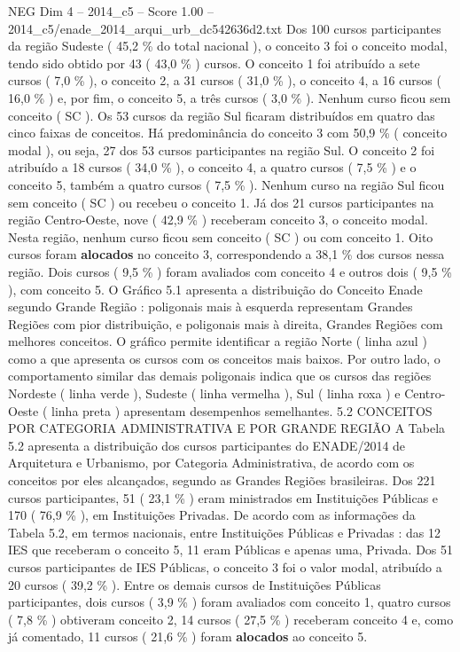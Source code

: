 \begin{textsample}{NEG Dim 4 – 2014\_c5 – Score 1.00 – 2014\_c5/enade\_2014\_arqui\_urb\_dc542636d2.txt}
Dos 100 cursos participantes da região Sudeste ( 45,2 \% do total nacional ), o conceito 3 foi o conceito modal, tendo sido obtido por 43 ( 43,0 \% ) cursos.
O conceito 1 foi atribuído a sete cursos ( 7,0 \% ), o conceito 2, a 31 cursos ( 31,0 \% ), o conceito 4, a 16 cursos ( 16,0 \% ) e, por fim, o conceito 5, a três cursos ( 3,0 \% ).
Nenhum curso ficou sem conceito ( SC ).
Os 53 cursos da região Sul ficaram distribuídos em quatro das cinco faixas de conceitos.
Há predominância do conceito 3 com 50,9 \% ( conceito modal ), ou seja, 27 dos 53 cursos participantes na região Sul.
O conceito 2 foi atribuído a 18 cursos ( 34,0 \% ), o conceito 4, a quatro cursos ( 7,5 \% ) e o conceito 5, também a quatro cursos ( 7,5 \% ).
Nenhum curso na região Sul ficou sem conceito ( SC ) ou recebeu o conceito 1.
Já dos 21 cursos participantes na região Centro-Oeste, nove ( 42,9 \% ) receberam conceito 3, o conceito modal.
Nesta região, nenhum curso ficou sem conceito ( SC ) ou com conceito 1.
Oito cursos foram \textbf{alocados} no conceito 3, correspondendo a 38,1 \% dos cursos nessa região.
Dois cursos ( 9,5 \% ) foram avaliados com conceito 4 e outros dois ( 9,5 \% ), com conceito 5.
O Gráfico 5.1 apresenta a distribuição do Conceito Enade segundo Grande Região : poligonais mais à esquerda representam Grandes Regiões com pior distribuição, e poligonais mais à direita, Grandes Regiões com melhores conceitos.
O gráfico permite identificar a região Norte ( linha azul ) como a que apresenta os cursos com os conceitos mais baixos.
Por outro lado, o comportamento similar das demais poligonais indica que os cursos das regiões Nordeste ( linha verde ), Sudeste ( linha vermelha ), Sul ( linha roxa ) e Centro-Oeste ( linha preta ) apresentam desempenhos semelhantes. 5.2 CONCEITOS POR CATEGORIA ADMINISTRATIVA E POR GRANDE REGIÃO A Tabela 5.2 apresenta a distribuição dos cursos participantes do ENADE/2014 de Arquitetura e Urbanismo, por Categoria Administrativa, de acordo com os conceitos por eles alcançados, segundo as Grandes Regiões brasileiras.
Dos 221 cursos participantes, 51 ( 23,1 \% ) eram ministrados em Instituições Públicas e 170 ( 76,9 \% ), em Instituições Privadas.
De acordo com as informações da Tabela 5.2, em termos nacionais, entre Instituições Públicas e Privadas : das 12 IES que receberam o conceito 5, 11 eram Públicas e apenas uma, Privada.
Dos 51 cursos participantes de IES Públicas, o conceito 3 foi o valor modal, atribuído a 20 cursos ( 39,2 \% ).
Entre os demais cursos de Instituições Públicas participantes, dois cursos ( 3,9 \% ) foram avaliados com conceito 1, quatro cursos ( 7,8 \% ) obtiveram conceito 2, 14 cursos ( 27,5 \% ) receberam conceito 4 e, como já comentado, 11 cursos ( 21,6 \% ) foram \textbf{alocados} ao conceito 5.

\end{textsample}
